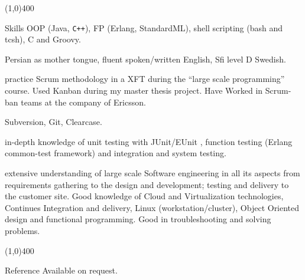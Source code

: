 \documentclass{resume}
\begin{document}
\begin{center}
\line(1,0){400}
\end{center}
\begin{category}{Skills}
\hspace{1 mm}OOP (Java, \texttt{C++}), FP (Erlang, StandardML), 
shell scripting (bash and tcsh), C and Groovy.

\hspace{1 mm}Persian as mother tongue, fluent spoken/written English,
Sfi level D Swedish.

\hspace{1 mm}practice Scrum methodology in a XFT during the ``large scale programming'' course.
Used Kanban during my master thesis project. Have Worked in Scrum-ban teams at the company of Ericsson.

\hspace{1 mm}Subversion, Git, Clearcase. 

\hspace{1 mm}in-depth knowledge of unit testing with JUnit/EUnit 
, function testing (Erlang common-test framework) and integration and system testing.

\hspace{1 mm}extensive understanding of large scale Software engineering in all its aspects from
requirements gathering to the design and development; testing and delivery to the customer site. 
Good knowledge of Cloud and Virtualization technologies, Continues Integration and delivery, 
Linux (workstation/cluster), Object Oriented design and functional programming.
Good in troubleshooting and solving problems.

\end{category}

\begin{center}
\line(1,0){400}
\end{center}


\begin{category}{Reference} 
\citemnobullet Available on request.
\end{category}
\end{document}
